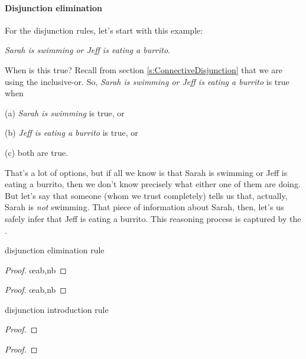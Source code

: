 \paragraph{Disjunction elimination}
For the disjunction rules, let's start with this example: 
\begin{ebullet}
	\item[] \textit{Sarah is swimming or Jeff is eating a burrito}. 
\end{ebullet}
When is this true? Recall from section \ref{s:ConnectiveDisjunction} that we are using the inclusive-or. So, \textit{Sarah is swimming or Jeff is eating a burrito} is true when
\begin{ebullet}
	\item[(a)] \textit{Sarah is swimming} is true, or 
	\item[(b)] \textit{Jeff is eating a burrito} is true, or 
	\item[(c)] both are true. 
\end{ebullet}
That's a lot of options, but if all we know is that Sarah is swimming or Jeff is eating a burrito, then we don't know precisely what either one of them are doing. But let's say that someone (whom we trust completely) tells us that, actually, Sarah is \textit{not} swimming. That piece of information about Sarah, then, let's us safely infer that Jeff is eating a burrito. This reasoning process is captured by the .

\medskip
\begin{tcbraster}[raster columns=2, raster valign=top]
\begin{factboxy}{disjunction elimination rule}
\begin{proof}
	 \oe{ab,nb}
\end{proof}

\begin{proof}
	 \oe{ab,nb}
\end{proof}
\end{factboxy}					%
\begin{factboxy}{disjunction introduction rule}
\begin{proof}
\end{proof}

\begin{proof}
\end{proof}
\end{factboxy}
\end{tcbraster}


